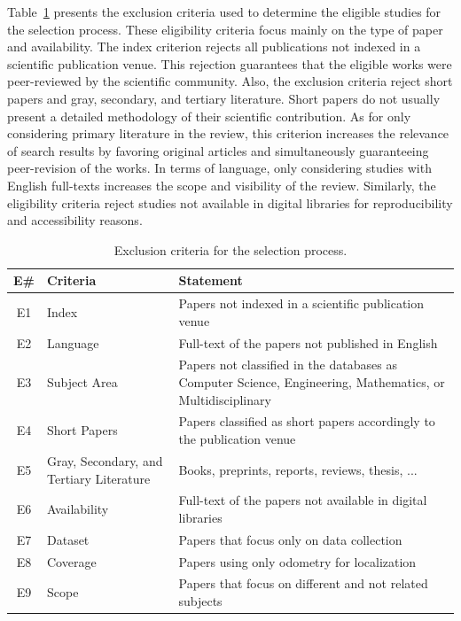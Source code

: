 Table~\ref{tab:methodology:exclusion-criteria} presents the exclusion criteria used to determine the eligible studies for the selection process. These eligibility criteria focus mainly on the type of paper and availability. The index criterion rejects all publications not indexed in a scientific publication venue. This rejection guarantees that the eligible works were peer-reviewed by the scientific community. Also, the exclusion criteria reject short papers and gray, secondary, and tertiary literature. Short papers do not usually present a detailed methodology of their scientific contribution. As for only considering primary literature in the review, this criterion increases the relevance of search results by favoring original articles and simultaneously guaranteeing peer-revision of the works. In terms of language, only considering studies with English full-texts increases the scope and visibility of the review. Similarly, the eligibility criteria reject studies not available in digital libraries for reproducibility and accessibility reasons.

\begin{table}[h]
  \renewcommand{\arraystretch}{1.25}
  \setlength{\tabcolsep}{3pt}
  \caption[Exclusion criteria for the selection process.]{Exclusion criteria for the selection process.}
  \label{tab:methodology:exclusion-criteria}
  \centering
  {\scriptsize
  \begin{tabular}{c m{} m{}}

\hline
\textbf{E\#} & \textbf{Criteria} & \textbf{Statement}\\
\hline
E1 &
Index &
Papers not indexed in a scientific publication venue\\
\hline
E2 &
Language &
Full-text of the papers not published in English\\
\hline
E3 &
Subject Area &
Papers not classified in the databases as Computer Science, Engineering, Mathematics, or Multidisciplinary\\
\hline
E4 &
Short Papers &
Papers classified as short papers accordingly to the publication venue\\
\hline
E5 &
Gray, Secondary, and Tertiary Literature &
Books, preprints, reports, reviews, thesis, ...\\
\hline
E6 &
Availability &
Full-text of the papers not available in digital libraries\\
\hline
E7 &
Dataset &
Papers that focus only on data collection\\
\hline
E8 &
Coverage &
Papers using only odometry for localization\\
\hline
E9 &
Scope &
Papers that focus on different and not related subjects\\
\hline

  \end{tabular}}
\end{table}

